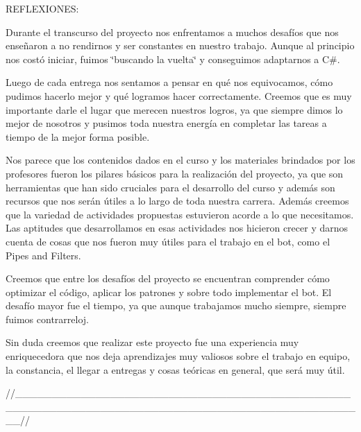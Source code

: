 REFLEXIONES\+:

Durante el transcurso del proyecto nos enfrentamos a muchos desafíos que nos enseñaron a no rendirnos y ser constantes en nuestro trabajo. Aunque al principio nos costó iniciar, fuimos \char`\"{}buscando la vuelta\char`\"{} y conseguimos adaptarnos a C\#.

Luego de cada entrega nos sentamos a pensar en qué nos equivocamos, cómo pudimos hacerlo mejor y qué logramos hacer correctamente. Creemos que es muy importante darle el lugar que merecen nuestros logros, ya que siempre dimos lo mejor de nosotros y pusimos toda nuestra energía en completar las tareas a tiempo de la mejor forma posible.

Nos parece que los contenidos dados en el curso y los materiales brindados por los profesores fueron los pilares básicos para la realización del proyecto, ya que son herramientas que han sido cruciales para el desarrollo del curso y además son recursos que nos serán útiles a lo largo de toda nuestra carrera. Además creemos que la variedad de actividades propuestas estuvieron acorde a lo que necesitamos. Las aptitudes que desarrollamos en esas actividades nos hicieron crecer y darnos cuenta de cosas que nos fueron muy útiles para el trabajo en el bot, como el Pipes and Filters.

Creemos que entre los desafíos del proyecto se encuentran comprender cómo optimizar el código, aplicar los patrones y sobre todo implementar el bot. El desafío mayor fue el tiempo, ya que aunque trabajamos mucho siempre, siempre fuimos contrarreloj.

Sin duda creemos que realizar este proyecto fue una experiencia muy enriquecedora que nos deja aprendizajes muy valiosos sobre el trabajo en equipo, la constancia, el llegar a entregas y cosas teóricas en general, que será muy útil.

//\+\_\+\+\_\+\+\_\+\+\_\+\+\_\+\+\_\+\+\_\+\+\_\+\+\_\+\+\_\+\+\_\+\+\_\+\+\_\+\+\_\+\+\_\+\+\_\+\+\_\+\+\_\+\+\_\+\+\_\+\+\_\+\+\_\+\+\_\+\+\_\+\+\_\+\+\_\+\+\_\+\+\_\+\+\_\+\+\_\+\+\_\+\+\_\+\+\_\+\+\_\+\+\_\+\+\_\+\+\_\+\+\_\+\+\_\+\+\_\+\+\_\+\+\_\+\+\_\+\+\_\+\+\_\+\+\_\+\+\_\+\+\_\+\+\_\+\+\_\+\+\_\+\+\_\+\+\_\+\+\_\+\+\_\+\+\_\+\+\_\+\+\_\+\+\_\+\+\_\+\+\_\+\+\_\+\+\_\+\+\_\+\+\_\+\+\_\+\+\_\+\+\_\+\+\_\+\+\_\+\+\_\+\+\_\+\+\_\+\+\_\+\+\_\+\+\_\+\+\_\+\+\_\+\+\_\+\+\_\+\+\_\+\+\_\+\+\_\+\+\_\+\+\_\+\+\_\+\+\_\+\+\_\+\+\_\+\+\_\+\+\_\+\+\_\+\+\_\+\+\_\+\+\_\+\+\_\+//

